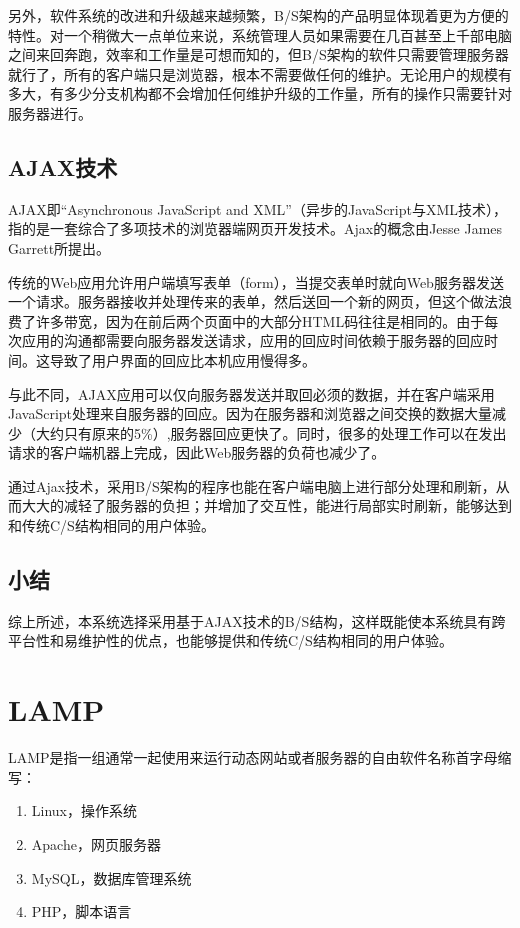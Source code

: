 另外，软件系统的改进和升级越来越频繁，B/S架构的产品明显体现着更为方便的特性。对一个稍微大一点单位来说，系统管理人员如果需要在几百甚至上千部电脑之间来回奔跑，效率和工作量是可想而知的，但B/S架构的软件只需要管理服务器就行了，所有的客户端只是浏览器，根本不需要做任何的维护。无论用户的规模有多大，有多少分支机构都不会增加任何维护升级的工作量，所有的操作只需要针对服务器进行。

\subsection{AJAX技术}
AJAX即“Asynchronous JavaScript and XML”（异步的JavaScript与XML技术），指的是一套综合了多项技术的浏览器端网页开发技术。Ajax的概念由Jesse James Garrett所提出。

传统的Web应用允许用户端填写表单（form），当提交表单时就向Web服务器发送一个请求。服务器接收并处理传来的表单，然后送回一个新的网页，但这个做法浪费了许多带宽，因为在前后两个页面中的大部分HTML码往往是相同的。由于每次应用的沟通都需要向服务器发送请求，应用的回应时间依赖于服务器的回应时间。这导致了用户界面的回应比本机应用慢得多。

与此不同，AJAX应用可以仅向服务器发送并取回必须的数据，并在客户端采用JavaScript处理来自服务器的回应。因为在服务器和浏览器之间交换的数据大量减少（大约只有原来的5\%）,服务器回应更快了。同时，很多的处理工作可以在发出请求的客户端机器上完成，因此Web服务器的负荷也减少了。

通过Ajax技术，采用B/S架构的程序也能在客户端电脑上进行部分处理和刷新，从而大大的减轻了服务器的负担；并增加了交互性，能进行局部实时刷新，能够达到和传统C/S结构相同的用户体验。

\subsection{小结}

综上所述，本系统选择采用基于AJAX技术的B/S结构，这样既能使本系统具有跨平台性和易维护性的优点，也能够提供和传统C/S结构相同的用户体验。

\section{LAMP}
\label{lamp}
LAMP是指一组通常一起使用来运行动态网站或者服务器的自由软件名称首字母缩写：

\begin{enumerate}
\item Linux，操作系统
\item Apache，网页服务器
\item MySQL，数据库管理系统
\item PHP，脚本语言
\end{enumerate}

